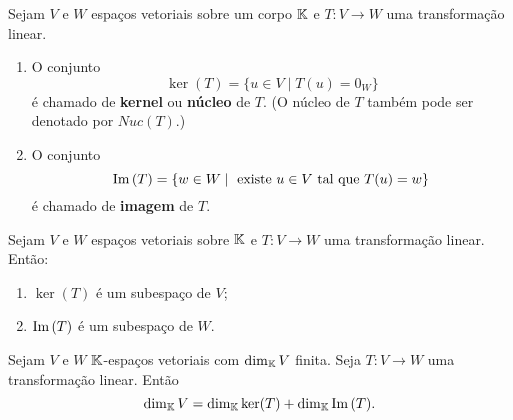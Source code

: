 \documentclass{beamer}
\begin{document}
\begin{frame}
    \begin{definicao}
        Sejam $V$ e $W$ espaços vetoriais sobre um corpo $\mathbb{K}$  e $T \colon V \to W$ uma transformação linear.
        \begin{enumerate}[label={\roman*})]
            \item O conjunto
            \[
            \ker(T)  = \{u \in V  \mid T(u) = 0_W\}
            \]
            é chamado de \textbf{kernel}  ou \textbf{núcleo} de $T$.  (O núcleo de $T$ também pode ser denotado por $Nuc(T)$.)

            \vspace*{1.5cm}

            \item O conjunto
            \[
            {\rm Im\,}(T)  = \{w \in W  \mid \mbox{ existe }  u \in V  \mbox{ tal que }  T(u) = w\}
            \]
            é chamado de \textbf{imagem} de $T$.
        \end{enumerate}
    \end{definicao}
\end{frame}

\begin{frame}

    \begin{proposicao}
        Sejam $V$ e $W$ espaços vetoriais sobre $\mathbb{K}$  e $T \colon V \to W$ uma transformação linear.  Então:
        \begin{enumerate}[label={\roman*})]
            \item $\ker(T)$  é um subespaço de $V$;

            \vspace*{1cm}

            \item ${\rm Im\,}(T)$  é um subespaço de $W$.
        \end{enumerate}
    \end{proposicao}
\end{frame}

\begin{frame}
    \begin{teorema}\label{teorema_do_nucleo_e_da_imagem}
        Sejam $V$ e $W$ $\mathbb{K}$-espa\c{c}os vetoriais  com $\dim_{\mathbb{K}}V$ finita.  Seja $T \colon V \to W$ uma transforma\c{c}\~ao linear.  Ent\~ao
        \[
            \dim_{\mathbb{K}}V  = \dim_{\mathbb{K}}\ker(T)  + \dim_{\mathbb{K}}{\rm Im\,}(T).
        \]
    \end{teorema}
\end{frame}
\end{document}
